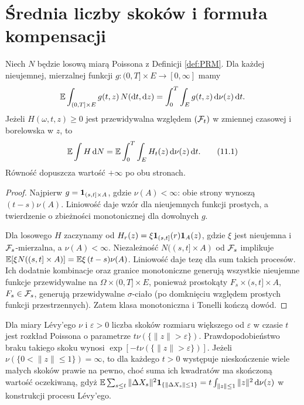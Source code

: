 \section{Średnia liczby skoków i formuła kompensacji}

\begin{twierdzenie}
\label{th:campbell}
Niech $N$ będzie losową miarą Poissona z Definicji
\ref{def:PRM}. Dla każdej nieujemnej, mierzalnej funkcji
$g:(0,T]\times E\to[0,\infty]$ mamy
\[
\mathbb{E}\int_{(0,T]\times E}g(t,z)\,N(\mathrm{d} t,\mathrm{d} z)
=\int_0^T\int_Eg(t,z)\,\mathrm{d}\nu(z)\,\mathrm{d} t.
\]
Jeżeli $H(\omega,t,z)\ge0$ jest przewidywalna względem
$(\mathcal{F}_t)$ w zmiennej czasowej i borelowska w $z$, to
\[
\mathbb{E}\int H\,\mathrm{d} N
=\mathbb{E}\int_0^T\int_E H_t(z)\,\mathrm{d}\nu(z)\,\mathrm{d} t.
\tag{11.1}\label{eq:compensation}
\]
Równość dopuszcza wartość $+\infty$ po obu stronach.
\end{twierdzenie}
\begin{proof}
Najpierw $g=\mathbf{1}_{(s,t]\times A}$, gdzie $\nu(A)<\infty$:
obie strony wynoszą $(t-s)\nu(A)$. Liniowość daje
wzór dla nieujemnych funkcji prostych, a twierdzenie o
zbieżności monotonicznej dla dowolnych $g$.

Dla losowego $H$ zaczynamy od
$H_r(z)=\xi\mathbf{1}_{(s,t]}(r)\mathbf{1}_{A}(z)$, gdzie $\xi$ jest
nieujemna i $\mathcal{F}_s$-mierzalna, a $\nu(A)<\infty$.
Niezależność $N((s,t]\times A)$ od $\mathcal{F}_s$ implikuje
$\mathbb{E}[\xi N((s,t]\times A)]=\mathbb{E}\xi\,(t-s)\nu(A)$.
Liniowość daje tezę dla sum takich procesów. Ich dodatnie
kombinacje oraz granice monotoniczne generują wszystkie
nieujemne funkcje przewidywalne na
$\Omega\times(0,T]\times E$, ponieważ prostokąty
$F_s\times(s,t]\times A$, $F_s\in\mathcal{F}_s$,
generują przewidywalne $\sigma$-ciało (po domknięciu
względem prostych funkcji przestrzennych). Zatem
klasa monotoniczna i Tonelli kończą dowód.
\end{proof}

\begin{przyklad}
Dla miary Lévy'ego $\nu$ i $\varepsilon>0$ liczba skoków
rozmiaru większego od $\varepsilon$ w czasie $t$ jest
rozkład Poissona o parametrze $t\nu(\{\|z\|>\varepsilon\})$.
Prawdopodobieństwo braku takiego skoku wynosi
$\exp[-t\nu(\{\|z\|>\varepsilon\})]$.
Jeżeli $\nu(\{0<\|z\|\le1\})=\infty$, to dla każdego
$t>0$ występuje nieskończenie wiele małych skoków
prawie na pewno, choć suma ich kwadratów ma skończoną
wartość oczekiwaną, gdyż
$\mathbb{E}\sum_{s\le t}\|\Delta X_s\|^2\mathbf{1}_{\{\|\Delta X_s\|\le1\}}
=t\int_{\|z\|\le1}\|z\|^2\,\mathrm{d}\nu(z)$ w konstrukcji
procesu Lévy'ego.
\end{przyklad}

